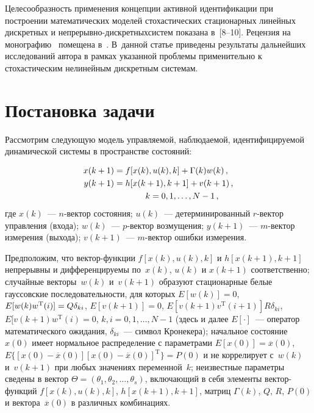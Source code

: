 \begin{multicols}{2}
  Целесообразность применения концепции активной идентификации при
построении ма\-те\-ма\-тических моделей стохастических стационарных линейных
дискретных и непрерывно-дискретных\linebreak сис\-тем показана в~[8--10]. Рецензия на
монографию~\cite{10-c} помещена в~\cite{11-c}. В~данной статье приведены
результаты дальнейших исследований автора в рамках указанной проблемы
применительно к стохастическим нелинейным дискретным системам.

\section{Постановка задачи}

  Рассмотрим следующую модель управляемой, наблюдаемой,
идентифицируемой динамической системы в пространстве состояний:

\noindent
  \begin{align}
  x(k+1)&=f[x(k),u(k),k]+\Gamma(k) w(k)\,,
  \label{e1-c}\\
  y(k+1) & =h[x(k+1),k+1]+v(k+1)\,,\notag\\
  &\hspace*{13mm} k=0, 1, \ldots , N-1\,,
  \label{e2-c}
  \end{align}
где $x(k)$~--- $n$-век\-тор состояния; $u(k)$~--- детерминированный
$r$-век\-тор управления (входа); $w(k)$~--- $p$-век\-тор возмущения;
$y(k+1)$~--- $m$-век\-тор измерения (выхода); $v(k+1)$~--- $m$-век\-тор
ошибки измерения.

  Предположим, что век\-тор-функ\-ции $f[x(k),u(k),k]$ и $h[x(k+1),k+1]$
непрерывны и дифференцируемы по~$x(k)$, $u(k)$ и $x(k+1)$ соответственно;
случайные векторы~$w(k)$ и~$v(k+1)$ образуют стационарные белые
гауссовские последовательности, для которых $E[w(k)]=0$,
$E[w(k)w^{\mathrm{T}}(i)]\hm =Q\delta_{ki}$, $E[v(k+1)]=0$, $E[v(k+1)v^{\mathrm{T}} (i+1)] R\delta_{ki}$,
$E[v(k+1) w^{\mathrm{T}}(i)=0$, $k,i=0, 1, \ldots , N-1$ (здесь и далее $E[\cdot]$~--- оператор
математического ожидания, $\delta_{ki}$~--- символ Кронекера); начальное
состояние~$x(0)$ имеет нормальное распределение с параметрами
$E[x(0)]=\overline{x}(0)$, $E\{[x(0)-\overline{x}(0)][x(0)-
\overline{x}(0)]^{\mathrm{T}}\}=P(0)$ и не коррелирует с~$w(k)$ и~$v(k+1)$ при любых
значениях переменной~$k$; неизвестные параметры сведены в вектор $\Theta =
(\theta_1,\theta_2,\ldots , \theta_s)$, включающий в себя элементы
  век\-тор-функ\-ций $f[x(k), u(k),k]$, $h[x(k+1), k+1]$, мат\-риц $\Gamma(k)$,
$Q$, $R$, $P(0)$ и вектора~$\overline{x}(0)$ в различных комбинациях.


\end{multicols}
